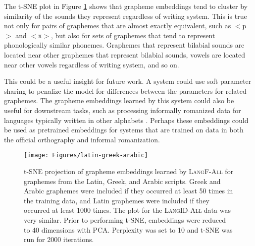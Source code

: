 The t-SNE plot in Figure \ref{figure:grapheme-tsne} shows that grapheme embeddings tend to cluster by similarity of the sounds they represent regardless of writing system. This is true not only for pairs of graphemes that are almost exactly equivalent, such as $<$p$>$ and $<$\textgreek{π}$>$, but also for sets of graphemes that tend to represent phonologically similar phonemes. Graphemes that represent bilabial sounds are located near other graphemes that represent bilabial sounds, vowels are located near other vowels regardless of writing system, and so on.

This could be a useful insight for future work. A system could use soft parameter sharing to penalize the model for differences between the parameters for related graphemes. The grapheme embeddings learned by this system could also be useful for downstream tasks, such as processing informally romanized data for languages typically written in other alphabets \citep{irvine2012processing,tobaili2016arabizi}. Perhaps these embeddings could be used as pretrained embeddings for systems that are trained on data in both the official orthography and informal romanization.

\begin{figure}
\texttt{[image: Figures/latin-greek-arabic]}
\caption{t-SNE projection of grapheme embeddings learned by \textsc{LangF-All} for graphemes from the Latin, Greek, and Arabic scripts. Greek and Arabic graphemes were included if they occurred at least 50 times in the training data, and Latin graphemes were included if they occurred at least 1000 times. The plot for the \textsc{LangID-All} data was very similar. Prior to performing t-SNE, embeddings were reduced to 40 dimensions with PCA. Perplexity was set to 10 and t-SNE was run for 2000 iterations.}
\label{figure:grapheme-tsne}
\end{figure}


